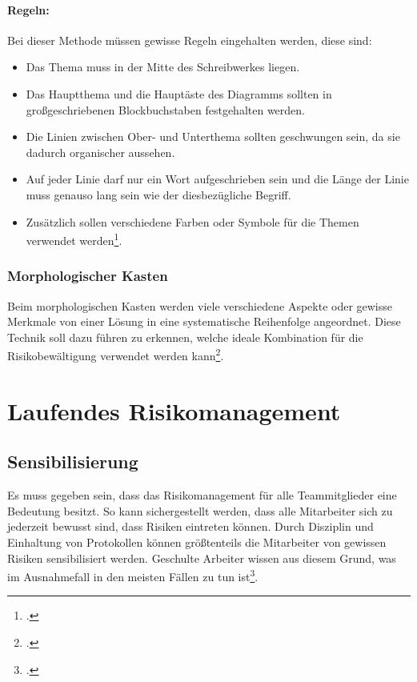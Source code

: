 \paragraph{Regeln:} Bei dieser Methode müssen gewisse Regeln eingehalten werden, diese sind:
\begin{itemize}
	\item Das Thema muss in der Mitte des Schreibwerkes liegen.
	\item Das Hauptthema und die Hauptäste des Diagramms sollten in großgeschriebenen Blockbuchstaben festgehalten werden.
	\item Die Linien zwischen Ober- und Unterthema sollten geschwungen sein, da sie dadurch organischer aussehen.
	\item Auf jeder Linie darf nur ein Wort aufgeschrieben sein und die Länge der Linie muss genauso lang sein wie der diesbezügliche Begriff.
	\item Zusätzlich sollen verschiedene Farben oder Symbole für die Themen verwendet werden\footcite{risikomanagement-diplomarbeit-methoden}.
\end{itemize}

\subsubsection{Morphologischer Kasten}
Beim morphologischen Kasten werden viele verschiedene Aspekte oder gewisse Merkmale von einer Lösung in eine systematische Reihenfolge angeordnet. Diese Technik soll dazu führen zu erkennen, welche ideale Kombination für die Risikobewältigung verwendet werden kann\footcite{risikomanagement-diplomarbeit-methoden}.

\section{Laufendes Risikomanagement}
\subsection{Sensibilisierung}
Es muss gegeben sein, dass das Risikomanagement für alle Teammitglieder eine Bedeutung besitzt. So kann sichergestellt werden, dass alle Mitarbeiter sich zu jederzeit bewusst sind, dass Risiken eintreten können. Durch Disziplin und Einhaltung von Protokollen können größtenteils die Mitarbeiter von gewissen Risiken sensibilisiert werden. Geschulte Arbeiter wissen aus diesem Grund, was im Ausnahmefall in den meisten Fällen zu tun ist\footcite{bva-risikomanagement}.


